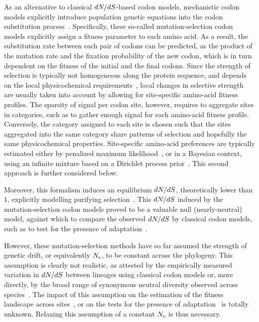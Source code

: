 \documentclass{MBE}
\begin{document}
	As an alternative to classical $dN/dS$-based {codon} models, mechanistic {codon} models explicitly introduce population genetic equations into the {codon} {substitution} process~\citep{Halpern1998}.
	Specifically, these so-called mutation-selection {codon} models explicitly assign a fitness parameter to each amino acid.
	As a result, the {substitution} rate between each pair of codons can be predicted, as the product of the mutation rate and the fixation probability of the new {codon}, which is in turn dependent on the fitness of the initial and the final codons.
	Since the strength of selection is typically not homogeneous along the protein sequence, and depends on the local physicochemical requirements~\citep{Echave2016, Goldstein2016,Goldstein2017}, local changes in selective strength are usually taken into account by allowing for site-specific amino-acid fitness profiles.
	The sparsity of signal per {codon} site, however, requires to aggregate sites in categories, such as to gather enough signal for each amino-acid fitness profile.
	Conversely, the category assigned to each site is chosen such that the sites aggregated into the same category share patterns of selection and hopefully the same physicochemical properties.
	Site-specific amino-acid preferences are typically estimated either by penalized maximum likelihood~\citep{Tamuri2012,Tamuri2014}, or in a Bayesian context, using an infinite mixture based on a {Dirichlet process} prior~\citep{Rodrigue2010,Rodrigue2014}.
	This second approach is further considered below.

	Moreover, this formalism induces an equilibrium $dN/dS$, theoretically lower than $1$, explicitly modelling purifying selection~\citep{Spielman2015, DosReis2015}.
	This $dN/dS$ induced by the mutation-selection {codon} models proved to be a valuable null ({nearly-neutral}) model, against which to compare the observed $dN/dS$ by classical {codon} models, such as to test for the presence of adaptation~\citep{Rodrigue2016}.

	However, these mutation-selection methods have so far assumed the strength of {genetic drift}, or equivalently $N_{\text{e}}$, to be constant across the phylogeny.
	This assumption is clearly not realistic, as attested by the empirically measured variation in $dN/dS$ between lineages using classical {codon} models or, more directly, by the broad range of {synonymous} {neutral} diversity observed across species~\citep{Galtier2016}.
	The impact of this assumption on the estimation of the fitness landscape across sites~\citep{Tamuri2014, Rodrigue2014}, or on the tests for the presence of adaptation~\citep{Rodrigue2016} is totally unknown.
	Relaxing this assumption of a constant $N_{\text{e}}$ is thus necessary.
\end{document}
